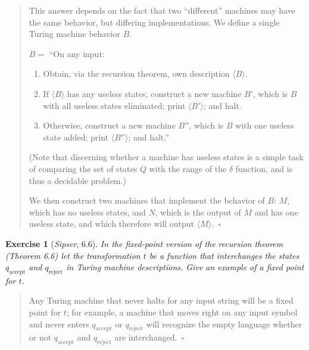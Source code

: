 \documentclass{article}
\theoremstyle{break}			%
\newtheorem{exercise}{Exercise}
\theoremstyle{plain}
\newcommand{\sipser}{\textit{Sipser}}
\newcommand{\encoding}[1]{\ensuremath{\langle#1\rangle}}
\newcommand{\qed}{~\ensuremath{\square}}
\newenvironment{answer}{\begin{quotation}\noindent}{\end{quotation}}
\begin{document}
\begin{answer}
This answer depends on the fact that two ``different'' machines may
have the same behavior, but differing implementations.  We define a
single Turing machine behavior $B$.

$B = $ ``On any input:
\begin{enumerate}
\item Obtain, via the recursion theorem, own description \encoding B.
\item If \encoding B has any useless states, construct a new machine
$B'$, which is $B$ with all useless states eliminated; print
\encoding{B'}; and halt.
\item Otherwise, construct a new machine $B''$, which is $B$ with one
useless state added; print \encoding{B''}; and halt.''
\end{enumerate}
(Note that discerning whether a machine has useless states is a simple
task of comparing the set of states $Q$ with the range of the $\delta$
function, and is thus a decidable problem.)

We then construct two machines that implement the behavior of $B$:
$M$, which has no useless states, and $N$, which is the output of $M$
and has one useless state, and which therefore will output \encoding
M.\qed
\end{answer}
\begin{exercise}[\sipser, 6.6]
In the fixed-point version of the recursion theorem (Theorem 6.6) let
the transformation $t$ be a function that interchanges the states
$q_{\text{accept}}$ and $q_{\text{reject}}$ in Turing machine
descriptions.  Give an example of a fixed point for $t$.
\end{exercise}
\begin{answer}
Any Turing machine that never halts for any input string will be a
fixed point for $t$; for example, a machine that moves right on any
input symbol and never enters $q_{\text{accept}}$ or
$q_{\text{reject}}$ will recognize the empty language whether or not
$q_{\text{accept}}$ and $q_{\text{reject}}$ are interchanged.\qed
\end{answer}
\end{document}
